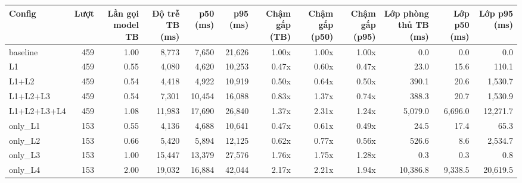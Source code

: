 \begin{tabular}{lrrrrrrrrrrr}
\toprule
Config & Lượt & Lần gọi model TB & Độ trễ TB (ms) & p50 (ms) & p95 (ms) & Chậm gấp (TB) & Chậm gấp (p50) & Chậm gấp (p95) & Lớp phòng thủ TB (ms) & Lớp p50 (ms) & Lớp p95 (ms) \\
\midrule
baseline & 459 & 1.00 & 8,773 & 7,650 & 21,626 & 1.00x & 1.00x & 1.00x & 0.0 & 0.0 & 0.0 \\
L1 & 459 & 0.55 & 4,080 & 4,620 & 10,253 & 0.47x & 0.60x & 0.47x & 23.0 & 15.6 & 110.1 \\
L1+L2 & 459 & 0.54 & 4,418 & 4,922 & 10,919 & 0.50x & 0.64x & 0.50x & 390.1 & 20.6 & 1,530.7 \\
L1+L2+L3 & 459 & 0.54 & 7,301 & 10,454 & 16,088 & 0.83x & 1.37x & 0.74x & 388.3 & 20.7 & 1,530.9 \\
L1+L2+L3+L4 & 459 & 1.08 & 11,983 & 17,690 & 26,840 & 1.37x & 2.31x & 1.24x & 5,079.0 & 6,696.0 & 12,271.7 \\
only\_L1 & 153 & 0.55 & 4,136 & 4,688 & 10,641 & 0.47x & 0.61x & 0.49x & 24.5 & 17.4 & 65.3 \\
only\_L2 & 153 & 0.66 & 5,420 & 5,894 & 12,125 & 0.62x & 0.77x & 0.56x & 526.6 & 8.6 & 2,534.7 \\
only\_L3 & 153 & 1.00 & 15,447 & 13,379 & 27,576 & 1.76x & 1.75x & 1.28x & 0.3 & 0.3 & 0.8 \\
only\_L4 & 153 & 2.00 & 19,032 & 16,884 & 42,044 & 2.17x & 2.21x & 1.94x & 10,386.8 & 9,338.5 & 20,619.5 \\
\bottomrule
\end{tabular}
